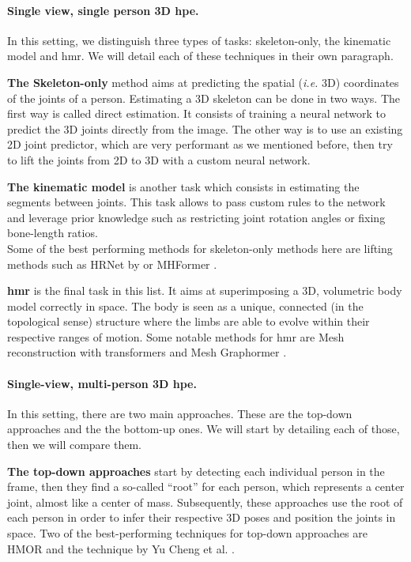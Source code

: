 \documentclass[runningheads]{llncs}
\begin{document}
\paragraph{Single view, single person 3D \ac{hpe}.}
In this setting, we distinguish three types of tasks:  skeleton-only, the kinematic model and \ac{hmr}. We will detail each of these techniques in their own paragraph.

\textbf{The Skeleton-only} method aims at predicting the spatial (\textit{i.e.} 3D) coordinates of the joints of a person. Estimating a 3D skeleton can be done in two ways. The first way is called direct estimation. It consists of training a neural network to predict the 3D joints directly from the image. The other way is to use an existing 2D joint predictor, which are very performant as we mentioned before, then try to lift the joints from 2D to 3D with a custom neural network.

\textbf{The kinematic model} is another task which consists in estimating the segments between joints. This task allows to pass custom rules to the network and leverage prior knowledge such as restricting joint rotation angles or fixing bone-length ratios. \\
Some of the best performing methods for skeleton-only methods here are lifting methods such as HRNet \cite{hrnet} by  or MHFormer \cite{multi hypothesis transformer}.

\textbf{\ac{hmr}} is the final task in this list. It aims at superimposing a 3D, volumetric body model correctly in space. The body is seen as a unique, connected (in the topological sense) structure where the limbs are able to evolve within their respective ranges of motion. Some notable methods for \ac{hmr} are
Mesh reconstruction with transformers \cite{mesh reconstruction with transformers} and Mesh Graphormer \cite{mesh graphormer}.
\paragraph{Single-view, multi-person 3D \ac{hpe}.}
In this setting, there are two main approaches. These are the top-down approaches and the the bottom-up ones. We will start by detailing each of those, then we will compare them.

\textbf{The top-down approaches} start by detecting each individual person in the frame, then they find a so-called ``root'' for each person, which represents a center joint, almost like a center of mass. Subsequently, these approaches use the root of each person in order to infer their respective 3D poses and position the joints in space. Two of the best-performing techniques for top-down approaches are HMOR \cite{HMOR} and the technique by Yu Cheng et al. \cite{graph and temporal convolutional network}.
\end{document}
